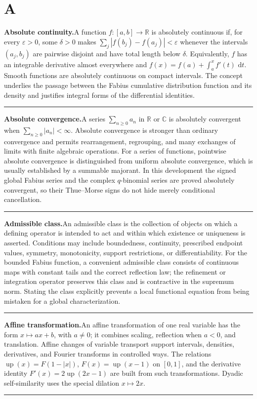 \documentclass[11pt,oneside]{article}
\newcommand{\R}{\mathbb R}
\newcommand{\C}{\mathbb C}
\newcommand{\Up}{\operatorname{up}}
\newcommand{\dd}{\,\mathrm d}
\newcommand{\glossaryentry}[3]{%
  \par\addvspace{0.95\baselineskip}%
  \phantomsection\hypertarget{gls:#1}{}%
  \noindent\textbf{\large #2.}\enspace #3\par
  \nopagebreak[2]\vspace{0.15\baselineskip}%
  \noindent\color{rulegray}\rule{\linewidth}{0.25pt}\color{black}%
}
\begin{document}
\section{A}\label{sec:letter-a}
\glossaryentry{absolute-continuity}{Absolute continuity}{A function \(f:[a,b]\to\R\) is absolutely continuous if, for every \(\varepsilon>0\), some \(\delta>0\) makes \(\sum_j|f(b_j)-f(a_j)|<\varepsilon\) whenever the intervals \((a_j,b_j)\) are pairwise disjoint and have total length below \(\delta\). Equivalently, \(f\) has an integrable derivative almost everywhere and \(f(x)=f(a)+\int_a^x f'(t)\,\dd t\). Smooth functions are absolutely continuous on compact intervals. The concept underlies the passage between the Fabius cumulative distribution function and its density and justifies integral forms of the differential identities.}
\glossaryentry{absolute-convergence}{Absolute convergence}{A series \(\sum_{n\ge 0} a_n\) in \(\R\) or \(\C\) is absolutely convergent when \(\sum_{n\ge 0}|a_n|<\infty\). Absolute convergence is stronger than ordinary convergence and permits rearrangement, regrouping, and many exchanges of limits with finite algebraic operations. For a series of functions, pointwise absolute convergence is distinguished from uniform absolute convergence, which is usually established by a summable majorant. In this development the signed global Fabius series and the complex \(q\)-binomial series are proved absolutely convergent, so their Thue--Morse signs do not hide merely conditional cancellation.}
\glossaryentry{admissible-class}{Admissible class}{An admissible class is the collection of objects on which a defining operator is intended to act and within which existence or uniqueness is asserted. Conditions may include boundedness, continuity, prescribed endpoint values, symmetry, monotonicity, support restrictions, or differentiability. For the bounded Fabius function, a convenient admissible class consists of continuous maps with constant tails and the correct reflection law; the refinement or integration operator preserves this class and is contractive in the supremum norm. Stating the class explicitly prevents a local functional equation from being mistaken for a global characterization.}
\glossaryentry{affine-transformation}{Affine transformation}{An affine transformation of one real variable has the form \(x\mapsto ax+b\), with \(a\ne0\); it combines scaling, reflection when \(a<0\), and translation. Affine changes of variable transport support intervals, densities, derivatives, and Fourier transforms in controlled ways. The relations \(\Up(x)=F(1-|x|)\), \(F(x)=\Up(x-1)\) on \([0,1]\), and the derivative identity \(F'(x)=2\Up(2x-1)\) are built from such transformations. Dyadic self-similarity uses the special dilation \(x\mapsto2x\).}
\end{document}

